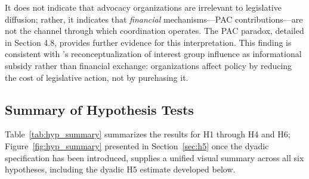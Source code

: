 It does not indicate that advocacy organizations are irrelevant to legislative diffusion; rather, it indicates that \emph{financial} mechanisms---PAC contributions---are not the channel through which coordination operates. The PAC paradox, detailed in Section 4.8, provides further evidence for this interpretation. This finding is consistent with \textcite{hallLobbyingLegislativeSubsidy2006a}'s reconceptualization of interest group influence as informational subsidy rather than financial exchange: organizations affect policy by reducing the cost of legislative action, not by purchasing it.

%

\subsection{Summary of Hypothesis Tests}
\label{sec:hyp_summary}

Table~\ref{tab:hyp_summary} summarizes the results for H1 through H4 and H6; Figure~\ref{fig:hyp_summary} presented in Section~\ref{sec:h5} once the dyadic specification has been introduced, supplies a unified visual summary across all six hypotheses, including the dyadic H5 estimate developed below.



